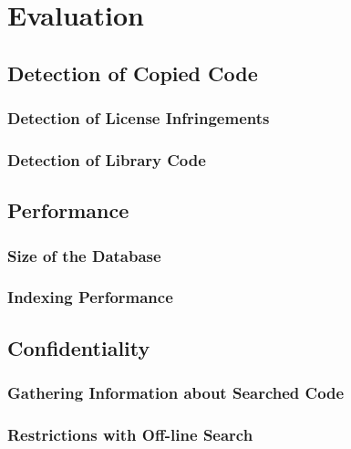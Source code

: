 
\chapter{Evaluation}\label{chapter:evaluation}
\section{Detection of Copied Code} %
\subsection{Detection of License Infringements}
\subsection{Detection of Library Code}

\section{Performance}
\subsection{Size of the Database}
\subsection{Indexing Performance}

\section{Confidentiality}
\subsection{Gathering Information about Searched Code}
\subsection{Restrictions with Off-line Search}